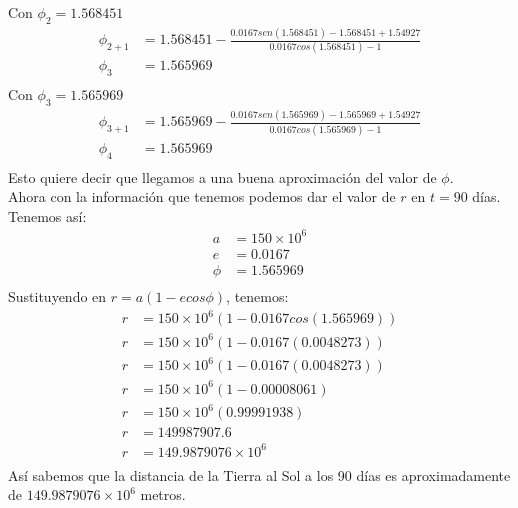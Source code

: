 Con $\phi_2 = 1.568451$
\begin{align*}
    \phi_{2+1} &= 1.568451 - \frac{0.0167 sen (1.568451) - 1.568451 + 1.54927}{0.0167 cos (1.568451) - 1} \\
    \phi_{3} &= 1.565969 \\
\end{align*}
Con $\phi_3 = 1.565969$
\begin{align*}
    \phi_{3+1} &= 1.565969 - \frac{0.0167 sen (1.565969) - 1.565969 + 1.54927}{0.0167 cos (1.565969) - 1} \\
    \phi_{4} &= 1.565969 \\
\end{align*}
Esto quiere decir que llegamos a una buena aproximación del valor de $\phi$. \\
\newline
Ahora con la información que tenemos podemos dar el valor de $r$ en $t = 90$ días. \\
Tenemos así:
\begin{align*}
    a &= 150 \times 10^{6} \\
    e &= 0.0167 \\
    \phi &= 1.565969 \\
\end{align*}
Sustituyendo en $r = a(1-ecos \phi)$, tenemos:
\begin{align*}
    r &= 150 \times 10^{6} (1 - 0.0167 cos (1.565969)) \\
    r &= 150 \times 10^{6} (1 - 0.0167 (0.0048273)) \\
    r &= 150 \times 10^{6} (1 - 0.0167 (0.0048273)) \\
    r &= 150 \times 10^{6} (1 - 0.00008061) \\
    r &= 150 \times 10^{6} (0.99991938) \\
    r &= 149987907.6 \\
    r &= 149.9879076 \times 10^{6} \\
\end{align*}
Así sabemos que la distancia de la Tierra al Sol a los 90 días es aproximadamente de $149.9879076 \times 10^{6}$ metros.

